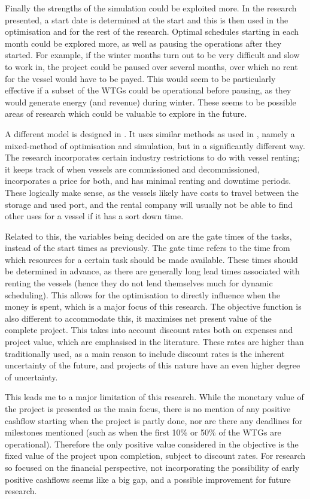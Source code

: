 \documentclass[a4paper,12pt]{article}
\begin{document}
Finally the strengths of the simulation could be exploited more. In the research presented, a start date is determined at the start and this is then used in the optimisation and for the rest of the research. Optimal schedules starting in each month could be explored more, as well as pausing the operations after they started. For example, if the winter months turn out to be very difficult and slow to work in, the project could be paused over several months, over which no rent for the vessel would have to be payed. This would seem to be particularly effective if a subset of the WTGs could be operational before pausing, as they would generate energy (and revenue) during winter. These seems to be possible areas of research which could be valuable to explore in the future.  

\bigskip

A different model is designed in \cite{kerkhove2017optimised}. It uses similar methods as used in \cite{barlow2018mixed}, namely a mixed-method of optimisation and simulation, but in a significantly different way. The research incorporates certain industry restrictions to do with vessel renting; it keeps track of when vessels are commissioned and decommissioned, incorporates a price for both, and has minimal renting and downtime periods. These logically make sense, as the vessels likely have costs to travel between the storage and used port, and the rental company will usually not be able to find other uses for a vessel if it has a sort down time. 

Related to this, the variables being decided on are the gate times of the tasks, instead of the start times as previously. The gate time refers to the time from which resources for a certain task should be made available. These times should be determined in advance, as there are generally long lead times associated with renting the vessels (hence they do not lend themselves much for dynamic scheduling). This allows for the optimisation to directly influence when the money is spent, which is a major focus of this research. The objective function is also different to accommodate this, it maximises net present value of the complete project. This takes into account discount rates both on expenses and project value, which are emphasised in the literature. These rates are higher than traditionally used, as a main reason to include discount rates is the inherent uncertainty of the future, and projects of this nature have an even higher degree of uncertainty.

This leads me to a major limitation of this research. While the monetary value of the project is presented as the main focus, there is no mention of any positive cashflow starting when the project is partly done, nor are there any deadlines for milestones mentioned (such as when the first 10\% or 50\% of the WTGs are operational). Therefore the only positive value considered in the objective is the fixed value of the project upon completion, subject to discount rates. For research so focused on the financial perspective, not incorporating the possibility of early positive cashflows seems like a big gap, and a possible improvement for future research.
\end{document}
